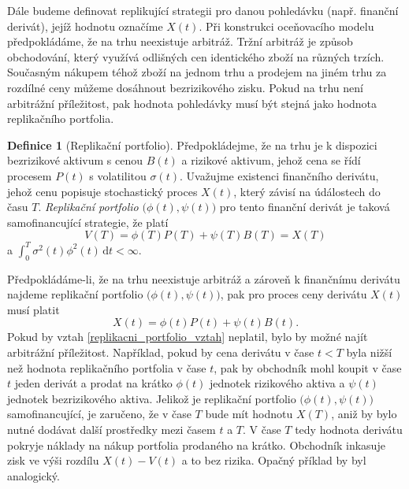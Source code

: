 \documentclass[a4paper,12pt]{report}
\theoremstyle{definition} \newtheorem{definice}[veta]{Definice}
\theoremstyle{remark}
\begin{document}
Dále budeme definovat replikující strategii pro danou pohledávku (např. finanční derivát), jejíž hodnotu označíme $X(t)$.
Při konstrukci oceňovacího modelu předpokládáme, že na trhu neexistuje arbitráž.
Tržní arbitráž je způsob obchodování, který využívá odlišných cen identického zboží na různých trzích.
Současným nákupem téhož zboží na jednom trhu a prodejem na jiném trhu za rozdílné ceny můžeme dosáhnout bezrizikového zisku.
Pokud na trhu není arbitrážní příležitost, pak hodnota pohledávky musí být stejná jako hodnota replikačního portfolia.
\begin{definice}[Replikační portfolio]
Předpokládejme, že na trhu je k dispozici bezrizikové aktivum s cenou $B(t)$ a rizikové aktivum, jehož cena se řídí procesem $P(t)$ s volatilitou $\sigma(t)$.
Uvažujme existenci finančního derivátu, jehož cenu popisuje stochastický proces $X(t)$, který závisí na údálostech do času $T$.
\textit{Replikační portfolio} $\big(\phi(t),\psi(t)\big)$ pro tento finanční derivát je taková samofinancující strategie, že platí
\begin{equation}\label{replikacni_portfolio}
V(T)=\phi(T)P(T)+\psi(T)B(T)=X(T)
\end{equation}
a $\int_0^T\sigma^2(t)\phi^2(t)\,\mathrm{d}t<\infty$.
\end{definice}
Předpokládáme-li, že na trhu neexistuje arbitráž a zároveň k finančnímu derivátu najdeme replikační portfolio $\big(\phi(t),\psi(t)\big)$, pak pro proces ceny derivátu $X(t)$ musí platit
\begin{equation}\label{replikacni_portfolio_vztah}
X(t)=\phi(t)P(t)+\psi(t)B(t).
\end{equation}
Pokud by vztah \eqref{replikacni_portfolio_vztah} neplatil, bylo by možné najít arbitrážní příležitost.
Například, pokud by cena derivátu v čase $t<T$ byla nižší než hodnota replikačního portfolia v čase $t$, pak by obchodník mohl koupit v čase $t$ jeden derivát a prodat na krátko $\phi(t)$ jednotek rizikového aktiva a $\psi(t)$ jednotek bezrizikového aktiva. 
Jelikož je replikační portfolio $\big(\phi(t),\psi(t)\big)$ samofinancující, je zaručeno, že v čase $T$ bude mít hodnotu $X(T)$, aniž by bylo nutné dodávat další prostředky mezi časem $t$ a $T$.
V čase $T$ tedy hodnota derivátu pokryje náklady na nákup portfolia prodaného na krátko.
Obchodník inkasuje zisk ve výši rozdílu $X(t)-V(t)$ a to bez rizika.
Opačný příklad by byl analogický.
 
\end{document}
